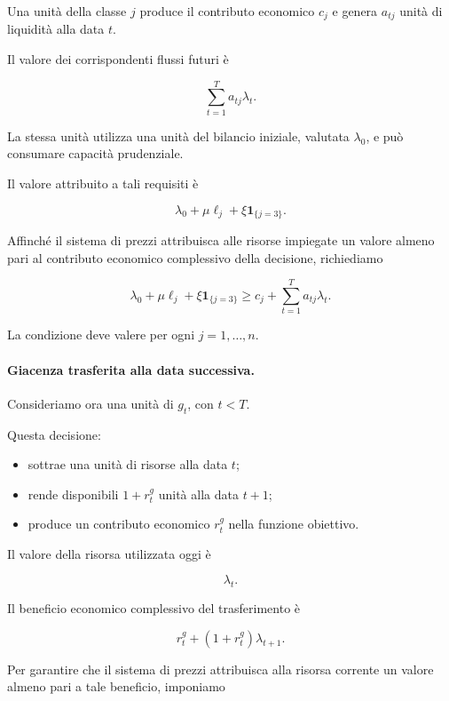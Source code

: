 Una unit\`{a} della classe $j$ produce il
contributo economico $c_j$ e genera
$a_{tj}$ unit\`{a} di liquidit\`{a}
alla data $t$.

Il valore dei corrispondenti flussi futuri \`{e}

\[
\sum_{t=1}^{T}a_{tj}\lambda_t.
\]

La stessa unit\`{a} utilizza una unit\`{a}
del bilancio iniziale, valutata $\lambda_0$,
e pu\`{o} consumare capacit\`{a} prudenziale.

Il valore attribuito a tali requisiti \`{e}

\[
\lambda_0+\mu\ell_j
+\xi\mathbf{1}_{\{j=3\}}.
\]

Affinch\'{e} il sistema di prezzi attribuisca
alle risorse impiegate un valore almeno pari
al contributo economico complessivo della
decisione, richiediamo

\[
\boxed{
\lambda_0+\mu\ell_j
+\xi\mathbf{1}_{\{j=3\}}
\geq
c_j+\sum_{t=1}^{T}a_{tj}\lambda_t.
}
\]

La condizione deve valere per ogni
$j=1,\ldots,n$.

\paragraph{Giacenza trasferita alla data successiva.}

Consideriamo ora una unit\`{a} di $g_t$,
con $t<T$.

Questa decisione:

\begin{itemize}

\item sottrae una unit\`{a} di risorse
alla data $t$;

\item rende disponibili $1+r_t^g$
unit\`{a} alla data $t+1$;

\item produce un contributo economico
$r_t^g$ nella funzione obiettivo.

\end{itemize}

Il valore della risorsa utilizzata oggi \`{e}

\[
\lambda_t.
\]

Il beneficio economico complessivo
del trasferimento \`{e}

\[
r_t^g+(1+r_t^g)\lambda_{t+1}.
\]

Per garantire che il sistema di prezzi
attribuisca alla risorsa corrente un valore
almeno pari a tale beneficio, imponiamo

